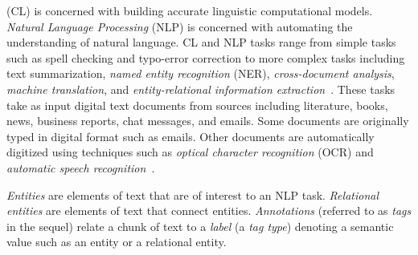 \transtrue
{} (CL) is concerned with building accurate linguistic computational models. 
{\em Natural Language Processing} (NLP) is concerned with automating the understanding of natural language. 
CL and NLP tasks range from simple tasks such as spell checking and typo-error correction to more complex tasks including text summarization, {\em named entity recognition} (NER), {\em cross-document analysis}, {\em machine translation}, and {\em entity-relational information extraction}~\cite{linckels2011natural,ferilli2011natural}.
These tasks take as input digital text documents from sources including literature, books, news, business reports, chat messages, and emails. 
Some documents are originally typed in digital format such as emails. 
Other documents are automatically digitized using techniques such as {\em optical character recognition} (OCR) and {\em automatic speech recognition}~\cite{margner2012guide,rashwan2012robust}. 

{\em Entities} are elements of text that are of interest to an NLP task. 
{\em Relational entities} are elements of text that connect entities. 
{\em Annotations} (referred to as {\em tags} in the sequel) relate a chunk of text to a {\em label} (a {\em tag type}) denoting a semantic value such as an entity or a relational entity.

